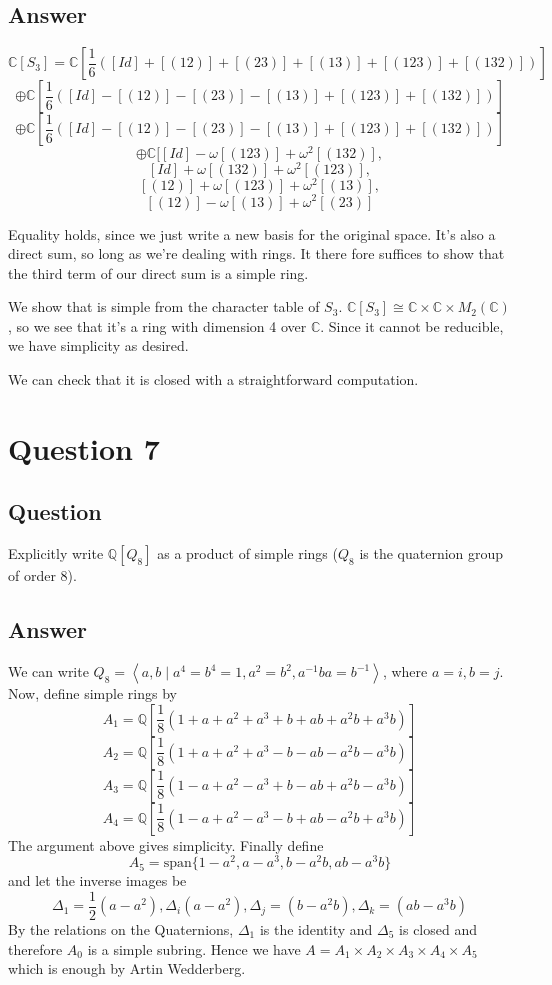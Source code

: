 \documentclass[11pt]{article}
\begin{document}
\subsection{Answer}
\[\mathbb{C}[S_3] = \mathbb{C}[\frac{1}{6} ( [Id]+ [(12)] + [(23)]  +[(13)] + [(123)] + [(132)])] \]
\[ \oplus \mathbb{C}[\frac{1}{6} ( [Id]- [(12)] - [(23)]  -[(13)] + [(123)] + [(132)])] \]
\[ \oplus \mathbb{C}[\frac{1}{6} ( [Id]- [(12)] - [(23)]  -[(13)] + [(123)] + [(132)])] \]
\[ \oplus \mathbb{C}[  [Id]- \omega [(123)]  + \omega^2 [(132)]  ,\]\[ [Id] + \omega [(132)] + \omega^2 [(123)]     , \]\[[(12)] + \omega [(123)]  + \omega^2 [(13)]  ,\]\[ [(12)]- \omega [(13)]  + \omega^2 [(23)]  \]

Equality holds, since we just write a new basis for the original space. It's also a direct sum, so long as we're dealing with rings. It there fore suffices to show that the third term of our direct sum is a simple ring. 

We show that is simple from the character table of $S_3$. $\mathbb{C}[S_3] \cong  \mathbb{C} \times \mathbb{C} \times M_2(\mathbb{C})$, so we see that it's a ring with dimension 4 over $\mathbb{C}$. Since it cannot be reducible, we have simplicity as desired.

We can check that it is closed with a straightforward computation.

\section{Question 7}
\subsection{Question}
Explicitly write $\mathbb{Q}[Q_8]$ as a product of simple rings ($Q_8$ is the quaternion group of order 8).
\subsection{Answer}
We can write $Q_8 = \left< a,b \mid a^4 =b^4 =1 , a^2 = b^2, a^{-1}ba = b^{-1} \right>$, where $a=i, b=j$. Now, define simple rings by
\[A_1=\mathbb{Q} \left[\frac{1}{8} \left(1+a+a^2+a^3+b + ab+a^2 b +a^3 b\right)\right]\]
\[A_2=\mathbb{Q} \left[\frac{1}{8} \left(1+a+a^2+a^3-b - ab-a^2 b -a^3 b\right)\right]\]
\[A_3=\mathbb{Q} \left[\frac{1}{8} \left(1-a+a^2-a^3+b - ab+a^2 b -a^3 b\right)\right]\]
\[A_4=\mathbb{Q} \left[\frac{1}{8} \left(1-a+a^2-a^3-b + ab-a^2 b +a^3 b\right)\right]\]
The argument above gives simplicity. Finally define 
\[A_5 = \mbox{span}\{1-a^2, a-a^3,b-a^2b,ab-a^3b \}\] and let the inverse images be 
\[\Delta_1 = \frac{1}{2}(a-a^2), \Delta_i(a-a^2), \Delta_j=(b-a^2b), \Delta_k=(ab-a^3b)\]
By the relations on the Quaternions, $\Delta_1$ is the identity and $\Delta_5$ is closed and therefore $A_0$ is a simple subring. Hence we have $A = A_1 \times A_2 \times A_3 \times A_4 \times A_5$ which is enough by Artin  Wedderberg.
\end{document}
